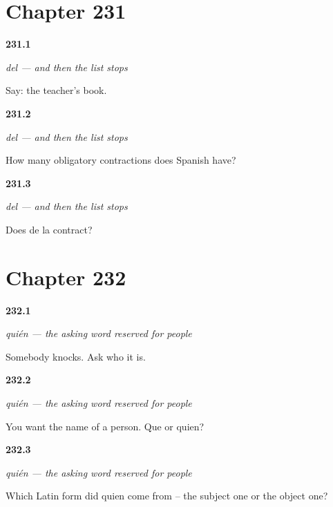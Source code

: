 \section*{Chapter 231}

\noindent\begin{minipage}[t]{\linewidth}
\raggedright
\hypertarget{review-ES-C61-del-say}{\textbf{231.1}} \emph{del — and then the list stops}\par
\small Say: the teacher's book.
\end{minipage}\par\medskip

\noindent\begin{minipage}[t]{\linewidth}
\raggedright
\hypertarget{review-ES-C61-del-count}{\textbf{231.2}} \emph{del — and then the list stops}\par
\small How many obligatory contractions does Spanish have?
\end{minipage}\par\medskip

\noindent\begin{minipage}[t]{\linewidth}
\raggedright
\hypertarget{review-ES-C61-del-la}{\textbf{231.3}} \emph{del — and then the list stops}\par
\small Does de la contract?
\end{minipage}\par\medskip

\section*{Chapter 232}

\noindent\begin{minipage}[t]{\linewidth}
\raggedright
\hypertarget{review-ES-C61-quien-ask}{\textbf{232.1}} \emph{quién — the asking word reserved for people}\par
\small Somebody knocks. Ask who it is.
\end{minipage}\par\medskip

\noindent\begin{minipage}[t]{\linewidth}
\raggedright
\hypertarget{review-ES-C61-quien-which}{\textbf{232.2}} \emph{quién — the asking word reserved for people}\par
\small You want the name of a person. Que or quien?
\end{minipage}\par\medskip

\noindent\begin{minipage}[t]{\linewidth}
\raggedright
\hypertarget{review-ES-C61-quien-latin}{\textbf{232.3}} \emph{quién — the asking word reserved for people}\par
\small Which Latin form did quien come from -- the subject one or the object one?
\end{minipage}\par\medskip

